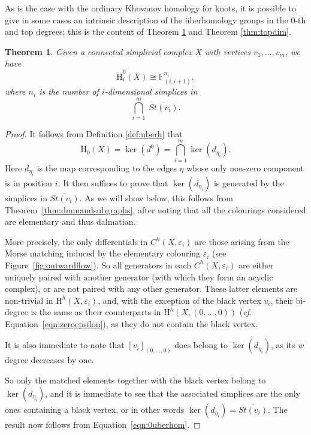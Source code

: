 \documentclass[11pt, a4paper, reqno, twoside, makeidx]{amsart}
\theoremstyle{remark}
\theoremstyle{plain}
\newtheorem{thm}{Theorem}[section]
\theoremstyle{definition}
\newcommand{\F}{\mathbb{F}}
\newcommand{\HH}{\mathrm{H}}
\newcommand{\uH}{\ddot{\mathrm{H}}}
\begin{document}
As is the case with the ordinary Khovanov homology for knots, it is possible to give in some cases an intrinsic description of the \"uberhomology groups in the $0$-th and top degrees; this is the content of Theorem \ref{thm:0dim} and Theorem \ref{thm:topdim}.
\begin{thm}\label{thm:0dim}
Given a connected simplicial complex $X$ with vertices $v_1, \ldots, v_m$, we have $$\uH^0_i (X) \cong \F^{n_i}_{(i, i+1)},$$
where $n_i$ is the number of $i$-dimensional simplices in $$\bigcap_{i = 1}^m \;\overline{St(v_i)}.$$
\end{thm}
\begin{proof}
It follows from Definition \ref{def:uberh} that   
\begin{equation}\label{eqn:0uberhom}
\uH_0(X) = \ker(d^0)  = \bigcap_{i = 1}^m \ker(d_{\eta_i}).
\end{equation} 
Here $d_{\eta_i}$ is the map corresponding to the edges $\eta$ whose only non-zero component is in position $i$.
It then suffices to prove that $\ker(d_{\eta_i})$ is generated by the simplices in $\overline{St(v_i)}$. As we will show below, this follows from Theorem~\ref{thm:dmmandsubgraphs}, after noting that all the colourings considered are elementary and thus dalmatian. 

More precisely, the only differentials in $C^h(X, \varepsilon_i)$ are those arising from the Morse matching induced by the elementary colouring $\varepsilon_i$ (see Figure~\ref{fig:outwardflow}). So all generators in each $C^h(X, \varepsilon_i)$ are either uniquely paired with another generator (with which they form an acyclic complex), or are not paired with any other generator. These latter elements are non-trivial in $\HH^h(X, \varepsilon_i)$, and, with the exception of the black vertex $v_i$, their bi-degree is the same as their counterparts in $\HH^h(X, (0,\ldots,0))$ (\emph{cf}. Equation~\eqref{eqn:zeroepsilon}), as they do not contain the black vertex. 

It is also immediate to note that $[v_i]_{(0,\ldots,0)}$ does belong to $\ker(d_{\eta_i})$, as its $w$ degree decreases by one.

So only the matched elements together with the black vertex  belong to $\ker(d_{\eta_i})$, and it is immediate to see that the associated simplices are the only ones containing a black vertex, or in other words $\ker(d_{\eta_i}) = \overline{St(v_i)}$.  The result now follows from Equation~\eqref{eqn:0uberhom}.
\end{proof}
\end{document}
